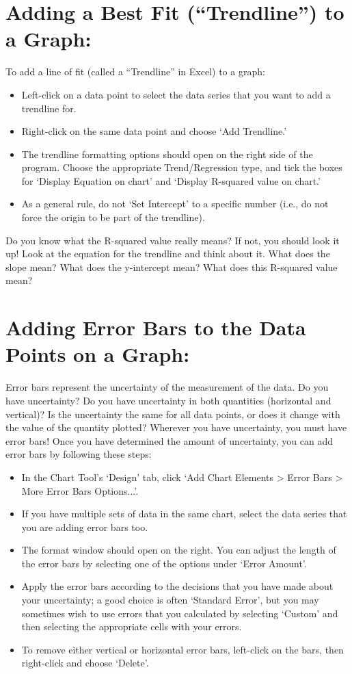 \section*{Adding a Best Fit (``Trendline'') to a Graph:}
To add a line of fit (called a ``Trendline'' in Excel) to a graph:
\begin{itemize}
\item Left-click on a data point to select the data series that you want to add a trendline for.
\item Right-click on the same data point and choose `Add Trendline.' 
\item The trendline formatting options should open on the right side of the program. Choose the appropriate Trend/Regression type, and tick the boxes for `Display Equation on chart' and `Display R-squared value on chart.' 
\item As a general rule, do not `Set Intercept' to a specific number (i.e., do not force the origin to be part of the trendline). 
\end{itemize}
Do you know what the R-squared value really means? 
If not, you should look it up! 
Look at the equation for the trendline and think about it. 
What does the slope mean? 
What does the y-intercept mean? What does this R-squared value mean?

\section*{Adding Error Bars to the Data Points on a Graph:}
Error bars represent the uncertainty of the measurement of the data. 
Do you have uncertainty? 
Do you have uncertainty in both quantities (horizontal and vertical)? 
Is the uncertainty the same for all data points, or does it change with the value of the quantity plotted? 
Wherever you have uncertainty, you must have error bars! 
Once you have determined the amount of uncertainty, you can add error bars by following these steps:
\begin{itemize}
\item In the Chart Tool's `Design' tab, click `Add Chart Elements > Error Bars > More Error Bars Options...'. 
\item If you have multiple sets of data in the same chart, select the data series that you are adding error bars too.
\item The format window should open on the right. You can adjust the length of the error bars by selecting one of the options under `Error Amount'.
\item Apply the error bars according to the decisions that you have made about your uncertainty; a good choice is often `Standard Error', but you may sometimes wish to use errors that you calculated by selecting `Custom' and then selecting the appropriate cells with your errors. 
\item To remove either vertical or horizontal error bars, left-click on the bars, then right-click and choose `Delete'.
\end{itemize}

